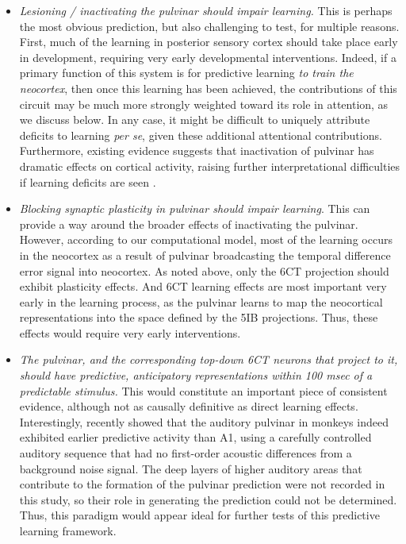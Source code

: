 \documentclass[11pt,twoside]{article}
\newif\myifpdf
\begin{document}
\begin{itemize}
	\item \emph{Lesioning / inactivating the pulvinar should impair learning.}  This is perhaps the most obvious prediction, but also challenging to test, for multiple reasons.  First, much of the learning in posterior sensory cortex should take place early in development, requiring very early developmental interventions.  Indeed, if a primary function of this system is for predictive learning \emph{to train the neocortex}, then once this learning has been achieved, the contributions of this circuit may be much more strongly weighted toward its role in attention, as we discuss below.  In any case, it might be difficult to uniquely attribute deficits to learning \emph{per se}, given these additional attentional contributions.  Furthermore, existing evidence suggests that inactivation of pulvinar has dramatic effects on cortical activity, raising further interpretational difficulties if learning deficits are seen \cite{ZhouSchaferDesimone16,PurushothamanMarionLiEtAl12}.
	\item \emph{Blocking synaptic plasticity in pulvinar should impair learning}.  This can provide a way around the broader effects of inactivating the pulvinar.   However, according to our computational model, most of the learning occurs in the neocortex as a result of pulvinar broadcasting the temporal difference error signal into neocortex.  As noted above, only the 6CT projection should exhibit plasticity effects.  And 6CT learning effects are most important very early in the learning process, as the pulvinar learns to map the neocortical representations into the space defined by the 5IB projections.  Thus, these effects would require very early interventions.
	\item \emph{The pulvinar, and the corresponding top-down 6CT neurons that project to it, should have predictive, anticipatory representations within 100 msec of a predictable stimulus.}  This would constitute an important piece of consistent evidence, although not as causally definitive as direct learning effects.  Interestingly,  recently showed that the auditory pulvinar in monkeys indeed exhibited earlier predictive activity than A1, using a carefully controlled auditory sequence that had no first-order acoustic differences from a background noise signal.  The deep layers of higher auditory areas that contribute to the formation of the pulvinar prediction were not recorded in this study, so their role in generating the prediction could not be determined.  Thus, this paradigm would appear ideal for further tests of this predictive learning framework.
	

\end{itemize}
\end{document}
